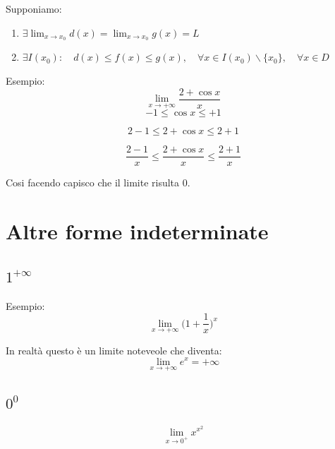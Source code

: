 Supponiamo:
\begin{enumerate}
    \item $\exists \lim_{x \rightarrow x_0} d(x) = \lim_{x \rightarrow x_0} g(x) = L$
    \item $\exists I(x_0) : \quad d(x) \leq f(x) \leq g(x), \quad \forall x \in I(x_0) \backslash \{x_0\},\quad \forall x \in D$
\end{enumerate}

Esempio:
\begin{equation*}
    \lim_{x \rightarrow + \infty} \frac{2+\cos x}{x}
\end{equation*}
\begin{equation*}
    -1 \leq \cos x \leq +1
\end{equation*}

\begin{equation*}
    2-1 \leq 2 + \cos x \leq 2+1
\end{equation*}

\begin{equation*}
    \frac{2-1}{x} \leq \frac{2 + \cos x}{x} \leq \frac{2+1}{x}
\end{equation*}

Cosi facendo capisco che il limite risulta 0.

\section{Altre forme indeterminate}
\subsection{$1^{+\infty}$}

Esempio:
\begin{equation*}
    \lim_{x \rightarrow + \infty} \Big(1 + \frac{1}{x}\Big)^x
\end{equation*}

In realtà questo è un limite noteveole che diventa:
\begin{equation*}
    \lim_{x \rightarrow + \infty} e^x = +\infty
\end{equation*}

\subsection{$0^{0}$}

\begin{equation*}
    \lim_{x \rightarrow 0^+} x^{x^2}
\end{equation*}


